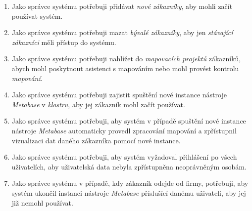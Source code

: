 \begin{enumerate}
    \item Jako správce systému potřebuji přidávat \textit{nové zákazníky}, aby mohli začít používat systém.
    \item Jako správce systému potřebuji mazat \textit{bývalé zákazníky}, aby jen \textit{stávající zákazníci} měli přístup do systému.
    \item Jako správce systému potřebuji nahlížet do \textit{mapovacích projektů} zákazníků, abych mohl poskytnout asistenci s mapováním nebo mohl provést kontrolu \textit{mapování}.
    \item Jako správce systému potřebuji zajistit spuštění nové instance nástroje \textit{Metabase} v \textit{klastru}, aby jej zákazník  mohl začít používat.
    \item Jako správce systému potřebuji, aby systém v případě spuštění nové instance nástroje \textit{Metabase} automaticky provedl zpracování mapování a zpřístupnil vizualizaci dat daného zákazníka pomocí nové instance.
    \item Jako správce systému potřebuji, aby systém vyžadoval přihlášení po všech uživatelích, aby uživatelská data nebyla zpřístupněna neoprávněným osobám.
    \item Jako správce systému v případě, kdy zákazník odejde od firmy, potřebuji, aby systém ukončil instanci nástroje \textit{Metabase} příslušící danému uživateli, aby jej již nemohl používat.
    
\end{enumerate}

